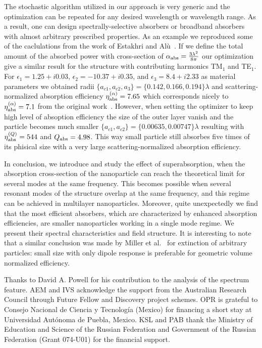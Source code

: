 \documentclass[aps,prl,twocolumn,showpacs,superscriptaddress,groupedaddress]{revtex4-1}  %
\begin{document}
The stochastic algorithm utilized in our approach is very generic and
the optimization can be repeated for any desired wavelength or
wavelength range.  As a result, one can design spectrally-selective
absorbers or broadband absorbers with almost arbitrary prescribed
properties.  As an example we reproduced some of the caclulations from
the work of Estakhri and Al\`u~\cite{Alu-2014}. If we define the total
amount of the absorbed power with cross-section of $\alpha_{\rm
  abs}=\frac{3\lambda^2}{8\pi}$ our optimization give a similar result
for the structure with contributing harmonics TM${_1}$ and TE$_1$.
For $\epsilon_1 = 1.25+i0.03$, $\epsilon_2 = -10.37+ i0.35$, and
$\epsilon_3=8.4+i2.33$ as material parameters we obtained radii
$\{a_{c1},a_{c2},a_3\}=\{0.142,0.166,0.194\}\lambda$ and
scattering-normalized absorption efficiency $\eta_{\rm abs}^{(\alpha)}
=7.65$ which corresponds nicely to $\eta_{\rm abs}^{(\alpha)} =7.1$
from the original work~\cite{Alu-2014}.  However, when setting the
optimizer to keep high level of absoption efficiency the size of the
outer layer vanish and the particle becomes much smaller
$\{a_{c1},a_{c2}\}=\{0.00635,0.00747\}\lambda$ resulting with
$\eta_{\rm abs}^{(Q)} =544$ and $Q_{\rm abs} = 4.98$.  This way small
particle still absorbes five times of its phisical size with a very
large scattering-normalized absorption efficiency.


In conclusion, we introduce and study the effect of superabsorption,
when the absorption cross-section of the nanoparticle can reach the
theoretical limit for several modes at the same frequency. This
becomes possible when several resonant modes of the structure overlap
at the same frequency, and this regime can be achieved in multilayer
nanoparticles. Moreover, quite unexpectedly we find that the most
efficient absorbers, which are characterized by enhanced absorption
efficiencies, are smaller nanoparticles working in a single mode
regime. We present their spectral characteristics and field structure.
  It is interesting to note that a similar conclusion was
made by Miller et al.~\cite{Miller-2014} for extinction of arbitrary
particles: small size with only dipole response is preferable for
geometric volume normalized efficiency.


\begin{acknowledgments}
  Thanks to David A. Powell for his contribution to the analysis of
  the spectrum feature.  AEM and IVS acknowledge the support
  from the Australian Research Council through Future Fellow and
  Discovery project schemes. OPR is grateful to Consejo Nacional de
  Ciencia y Tecnolog\'{i}a (Mexico) for financing a short stay at
  Universidad Autónoma de Puebla, Mexico.  KSL and PAB thank the
  Ministry of Education and Science of the Russian Federation and
  Government of the Russian Federation (Grant 074-U01) for the
  financial support.
\end{acknowledgments}


\end{document}
